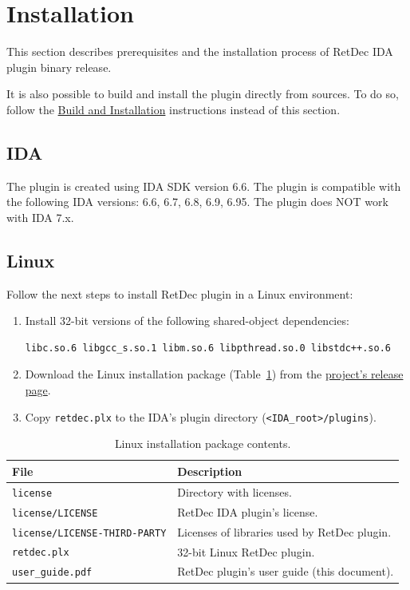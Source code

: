 \documentclass[pdftex, a4paper,12pt, oneside, svgnames]{article}
\begin{document}
\newpage
\section{Installation}
\label{sec:installation}
This section describes prerequisites and the installation process of RetDec IDA plugin binary release.

It is also possible to build and install the plugin directly from sources. To do so, follow the \href{https://github.com/avast-tl/retdec-idaplugin#build-and-installation}{Build and Installation} instructions instead of this section.

\subsection{IDA}
The plugin is created using IDA SDK version 6.6. The plugin is compatible with the following IDA versions: 6.6, 6.7, 6.8, 6.9, 6.95. The plugin does NOT work with IDA 7.x.

\subsection{Linux}
Follow the next steps to install RetDec plugin in a Linux environment:
\begin{enumerate}
	\item Install 32-bit versions of the following shared-object dependencies:
\begin{verbatim}
libc.so.6 libgcc_s.so.1 libm.so.6 libpthread.so.0 libstdc++.so.6
\end{verbatim}
	\item Download the Linux installation package (Table~\ref{table:installation-package-linux}) from the \href{https://github.com/avast-tl/retdec-idaplugin/releases}{project's release page}.
	\item Copy \texttt{retdec.plx} to the IDA's plugin directory (\texttt{<IDA_root>/plugins}).
\end{enumerate}

\begin{table}[!ht]
\centering
\caption{Linux installation package contents.}
\label{table:installation-package-linux}
\begin{tabular}{ll}
\textbf{File} & \textbf{Description}\\
\hline
\texttt{license} & Directory with licenses. \\
\texttt{license/LICENSE} & RetDec IDA plugin's license. \\
\texttt{license/LICENSE-THIRD-PARTY} & Licenses of libraries used by RetDec plugin. \\
\texttt{retdec.plx} & 32-bit Linux RetDec plugin. \\
\texttt{user_guide.pdf} & RetDec plugin's user guide (this document). \\
\end{tabular}
\end{table}
\end{document}
